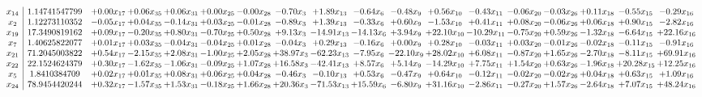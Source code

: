\documentclass[9pt]{article}
\begin{document}
 \[\begin{array}{c| c c@{\hskip 2pt} c@{\hskip 2pt} c@{\hskip 2pt} c@{\hskip 2pt} c@{\hskip 2pt} c@{\hskip 2pt} c@{\hskip 2pt} c@{\hskip 2pt} c@{\hskip 2pt} c@{\hskip 2pt} c@{\hskip 2pt} c@{\hskip 2pt} c@{\hskip 2pt} c@{\hskip 2pt} c@{\hskip 2pt} c@{\hskip 2pt} }
 x_{14}   &  1.14741547799 & +  0.00 x_{17} & +  0.06 x_{35} & +  0.06 x_{31} & +  0.00 x_{25} & -0.00 x_{28} & -0.70 x_{3} & +  1.89 x_{13} & -0.64 x_{6} & -0.48 x_{9} & +  0.56 x_{10} & -0.43 x_{11} & -0.06 x_{20} & -0.03 x_{26} & +  0.11 x_{18} & -0.55 x_{15} & -0.29 x_{16}\\
 x_{2}   &  1.12273110352 & -0.05 x_{17} & +  0.04 x_{35} & -0.14 x_{31} & +  0.03 x_{25} & -0.01 x_{28} & -0.89 x_{3} & +  1.39 x_{13} & -0.33 x_{6} & +  0.60 x_{9} & -1.53 x_{10} & +  0.41 x_{11} & +  0.08 x_{20} & -0.06 x_{26} & +  0.06 x_{18} & +  0.90 x_{15} & -2.82 x_{16}\\
 x_{19}   &  17.3490819162 & +  0.09 x_{17} & -0.20 x_{35} & +  0.80 x_{31} & -0.70 x_{25} & +  0.50 x_{28} & +  9.13 x_{3} & -14.91 x_{13} & -14.13 x_{6} & +  3.94 x_{9} & + 22.10 x_{10} & -10.29 x_{11} & -0.75 x_{20} & +  0.59 x_{26} & -1.32 x_{18} & -6.64 x_{15} & + 22.16 x_{16}\\
 x_{7}   &  1.40625822077 & +  0.01 x_{17} & +  0.03 x_{35} & -0.04 x_{31} & -0.04 x_{25} & +  0.01 x_{28} & -0.04 x_{3} & +  0.29 x_{13} & -0.16 x_{6} & +  0.00 x_{9} & +  0.28 x_{10} & -0.03 x_{11} & +  0.03 x_{20} & -0.01 x_{26} & -0.02 x_{18} & -0.11 x_{15} & -0.91 x_{16}\\
 x_{21}   &  71.2045003822 & +  0.54 x_{17} & -2.15 x_{35} & +  2.08 x_{31} & -1.00 x_{25} & +  2.05 x_{28} & + 38.97 x_{3} & -62.23 x_{13} & -7.95 x_{6} & -22.10 x_{9} & + 28.02 x_{10} & +  6.08 x_{11} & -0.87 x_{20} & +  1.65 x_{26} & -2.70 x_{18} & -8.11 x_{15} & + 69.91 x_{16}\\
 x_{22}   &  22.1524624379 & +  0.30 x_{17} & -1.62 x_{35} & -1.06 x_{31} & -0.09 x_{25} & +  1.07 x_{28} & + 16.58 x_{3} & -42.41 x_{13} & +  8.57 x_{6} & +  5.14 x_{9} & -14.29 x_{10} & +  7.75 x_{11} & +  1.54 x_{20} & +  0.63 x_{26} & -1.96 x_{18} & + 20.28 x_{15} & + 12.25 x_{16}\\
 x_{5}   &  1.8410384709 & +  0.02 x_{17} & +  0.01 x_{35} & +  0.08 x_{31} & +  0.06 x_{25} & +  0.04 x_{28} & -0.46 x_{3} & -0.10 x_{13} & +  0.53 x_{6} & -0.47 x_{9} & +  0.64 x_{10} & -0.12 x_{11} & -0.02 x_{20} & -0.02 x_{26} & +  0.04 x_{18} & +  0.63 x_{15} & +  1.09 x_{16}\\
 x_{24}   &  78.9454420244 & +  0.32 x_{17} & -1.57 x_{35} & +  1.53 x_{31} & -0.18 x_{25} & +  1.66 x_{28} & + 20.36 x_{3} & -71.53 x_{13} & + 15.59 x_{6} & -6.80 x_{9} & + 31.16 x_{10} & -2.86 x_{11} & -0.27 x_{20} & +  1.57 x_{26} & -2.64 x_{18} & +  7.07 x_{15} & + 48.24 x_{16}\\

\end{array}\]
\end{document}
